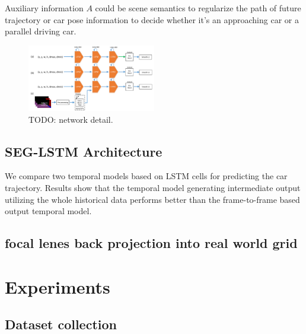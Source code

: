 \documentclass[10pt,twocolumn,letterpaper]{article}
\begin{document}
Auxiliary information $A$ could be scene semantics to regularize the path of future trajectory or car pose information to decide whether it's an approaching car or a parallel driving car.


\begin{figure}[t]
        \centering
        \includegraphics[width=0.5\textwidth]{figures/network_detail.pdf}
        \caption{ {\small TODO: network detail.}}
        \label{fig:dataset}
\end{figure}
\subsection{SEG-LSTM Architecture}


We compare two temporal models based on LSTM cells for predicting the car trajectory.
Results show that the temporal model generating intermediate output utilizing the whole historical data performs better than the frame-to-frame based output temporal model.





\subsection{focal lenes back projection into real world grid}



\section{Experiments}

\subsection{Dataset collection}
\end{document}
